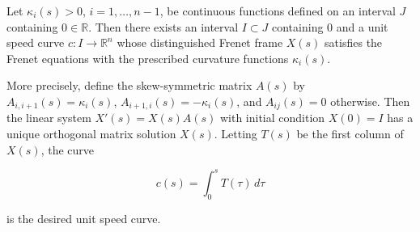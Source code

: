 Let $\kappa_i(s) > 0$, $i = 1, \dots, n-1$, be continuous functions defined on an interval $J$ containing $0 \in \mathbb{R}$. Then there exists an interval $I \subset J$ containing $0$ and a unit speed curve $c: I \to \mathbb{R}^n$ whose distinguished Frenet frame $X(s)$ satisfies the Frenet equations with the prescribed curvature functions $\kappa_i(s)$.

More precisely, define the skew-symmetric matrix $A(s)$ by $A_{i,i+1}(s) = \kappa_i(s)$, $A_{i+1,i}(s) = -\kappa_i(s)$, and $A_{ij}(s) = 0$ otherwise. Then the linear system $X'(s) = X(s) A(s)$ with initial condition $X(0) = I$ has a unique orthogonal matrix solution $X(s)$. Letting $T(s)$ be the first column of $X(s)$, the curve

$$c(s) = \int_0^s T(\tau) \, d\tau$$

is the desired unit speed curve.
